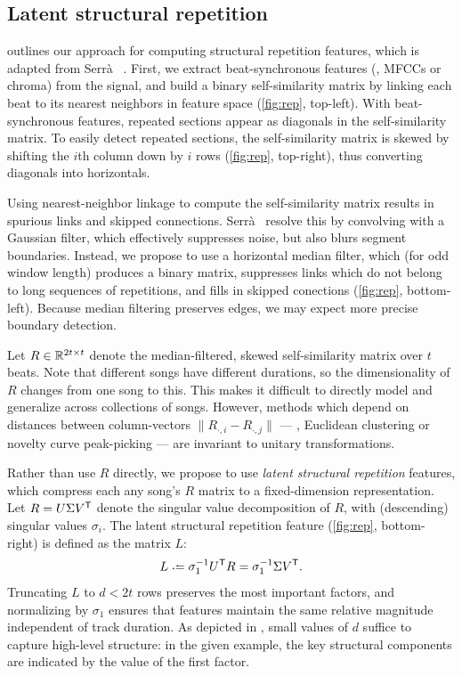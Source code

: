 \documentclass{article}
\begin{document}
\subsection{Latent structural repetition}
 outlines our approach for computing structural repetition features, which is adapted from
Serr\`{a} \etal~\cite{serra2012unsupervised}.  First, we extract beat-synchronous features (\eg, MFCCs or chroma) 
from the signal, and build a binary self-similarity matrix by linking each beat to its nearest neighbors in feature
space (\cref{fig:rep}, top-left). With beat-synchronous features, repeated sections appear as diagonals in the self-similarity
matrix. To easily detect repeated sections, the self-similarity matrix is skewed by shifting the $i$th column down by $i$ rows
(\cref{fig:rep}, top-right), thus converting diagonals into horizontals.

Using nearest-neighbor linkage to compute the self-similarity matrix results in spurious links and skipped connections. 
Serr\`{a}~\etal{} resolve this by convolving with a Gaussian filter, which effectively suppresses noise, but also blurs
segment boundaries. Instead, we propose to use a horizontal median filter, which (for odd window length) produces a binary matrix,
suppresses links which do not belong to long sequences of repetitions, and fills in skipped conections (\cref{fig:rep},
bottom-left). Because median filtering preserves edges, we may expect more precise boundary detection.

Let $R \in \mathbb{R}^{2t \times t}$ denote the median-filtered, skewed self-similarity matrix over $t$ beats.  
Note that different songs have different durations, so the dimensionality of $R$ changes from one song to this. 
This makes it difficult to directly model and generalize across collections of songs.
However, methods which depend on distances between column-vectors ${\|R_{\cdot, i} - R_{\cdot, j}\|}$ --- 
\eg, Euclidean clustering or novelty curve peak-picking --- are invariant to unitary transformations.

Rather than use $R$ directly, we propose to use \emph{latent structural repetition} features, which compress each
any song's $R$ matrix to a fixed-dimension representation.  Let $R = U\Sigma V^\mathsf{T}$ denote the singular value decomposition of $R$,
with (descending) singular values $\sigma_i$. The latent structural repetition feature (\cref{fig:rep}, bottom-right) is defined as the matrix $L$:
\begin{equation}
L \defeq \sigma_1^{-1} U\trans R = \sigma_1^{-1} \Sigma V\trans.\label{eq:latent-rep}
\end{equation}
Truncating $L$ to $d < 2t$ rows preserves the most important factors, and normalizing by $\sigma_1$ ensures that
features maintain the same relative magnitude independent of track duration.  As depicted in , small values of $d$
suffice to capture high-level structure: in the given example, the key structural components are indicated by the value of the first
factor.
\end{document}
